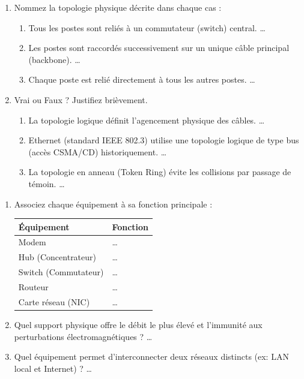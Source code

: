 \documentclass[11pt]{article}
\begin{document}
\begin{exercice}
\begin{enumerate}
    \item Nommez la topologie physique décrite dans chaque cas :
    \begin{enumerate}
        \item Tous les postes sont reliés à un commutateur (switch) central. \ldots
        \item Les postes sont raccordés successivement sur un unique câble principal (backbone). \ldots
        \item Chaque poste est relié directement à tous les autres postes. \ldots
    \end{enumerate}
    \item Vrai ou Faux ? Justifiez brièvement.
    \begin{enumerate}
        \item La topologie logique définit l'agencement physique des câbles. \ldots
        \item Ethernet (standard IEEE 802.3) utilise une topologie logique de type bus (accès CSMA/CD) historiquement. \ldots
        \item La topologie en anneau (Token Ring) évite les collisions par passage de témoin. \ldots
    \end{enumerate}
\end{enumerate}
\end{exercice}

\begin{exercice}
\begin{enumerate}
    \item Associez chaque équipement à sa fonction principale :
    \begin{tabular}{|l|l|}
    \hline
    \textbf{Équipement} & \textbf{Fonction} \\
    \hline
    Modem & \ldots \\
    \hline
    Hub (Concentrateur) & \ldots \\
    \hline
    Switch (Commutateur) & \ldots \\
    \hline
    Routeur & \ldots \\
    \hline
    Carte réseau (NIC) & \ldots \\
    \hline
    \end{tabular}
    \item Quel support physique offre le débit le plus élevé et l'immunité aux perturbations électromagnétiques ? \ldots
    \item Quel équipement permet d'interconnecter deux réseaux distincts (ex: LAN local et Internet) ? \ldots
\end{enumerate}
\end{exercice}
\end{document}

